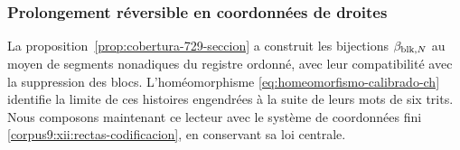 \subsubsection{Prolongement réversible en coordonnées de droites}
\label{corpus9:xii:rectas-prolongacion}

La proposition~\ref{prop:cobertura-729-seccion} a construit les
bijections \(\beta_{{\rm blk},N}\) au moyen de segments nonadiques du
registre ordonné, avec leur compatibilité avec la suppression des
blocs. L’homéomorphisme
\eqref{eq:homeomorfismo-calibrado-ch} identifie la limite de ces
histoires engendrées à la suite de leurs mots de six trits.
Nous composons maintenant ce lecteur avec le système de coordonnées fini
\eqref{corpus9:xii:rectas-codificacion}, en conservant sa loi centrale.

